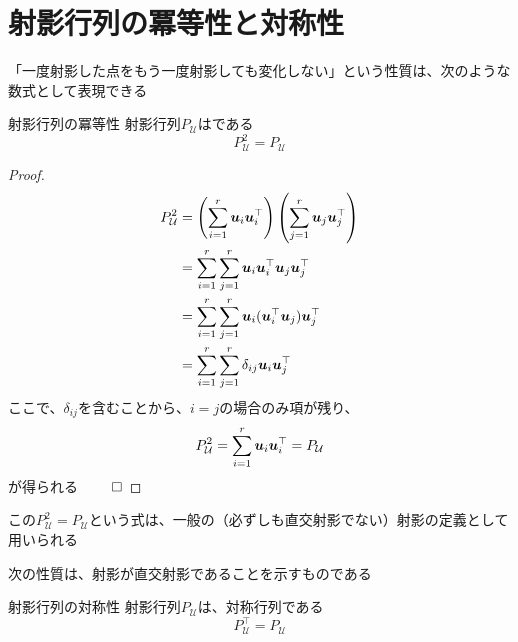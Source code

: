 \documentclass[../../../topic_linear-algebra]{subfiles}
\begin{document}
\sectionline
\section{射影行列の冪等性と対称性}

「一度射影した点をもう一度射影しても変化しない」という性質は、次のような数式として表現できる

\begin{theorem}{射影行列の冪等性}
  射影行列$P_{\mathcal{U}}$はである
  \begin{equation*}
    P_{\mathcal{U}}^2 = P_{\mathcal{U}}
  \end{equation*}
\end{theorem}

\begin{proof}
  \begin{align*}
    P_{\mathcal{U}}^2 & = \left( \sum_{i=1}^{r} \vb*{u}_i\vb*{u}_i^\top \right) \left( \sum_{j=1}^{r} \vb*{u}_j\vb*{u}_j^\top \right) \\
                      & = \sum_{i=1}^{r} \sum_{j=1}^{r} \vb*{u}_i\vb*{u}_i^\top \vb*{u}_j\vb*{u}_j^\top                               \\
                      & = \sum_{i=1}^{r} \sum_{j=1}^{r} \vb*{u}_i (\vb*{u}_i^\top \vb*{u}_j) \vb*{u}_j^\top                           \\
                      & = \sum_{i=1}^{r} \sum_{j=1}^{r} \delta_{ij}\vb*{u}_i \vb*{u}_j^\top
  \end{align*}
  ここで、$\delta_{ij}$を含むことから、$i = j$の場合のみ項が残り、
  \begin{equation*}
    P_{\mathcal{U}}^2 = \sum_{i=1}^{r} \vb*{u}_i \vb*{u}_i^\top = P_{\mathcal{U}}
  \end{equation*}
  が得られる $\qed$
\end{proof}

\br

この$P_{\mathcal{U}}^2 = P_{\mathcal{U}}$という式は、一般の（必ずしも直交射影でない）射影の定義として用いられる

\br

次の性質は、射影が直交射影であることを示すものである

\begin{theorem}{射影行列の対称性}
  射影行列$P_{\mathcal{U}}$は、対称行列である
  \begin{equation*}
    P_{\mathcal{U}}^\top = P_{\mathcal{U}}
  \end{equation*}
\end{theorem}
\end{document}
